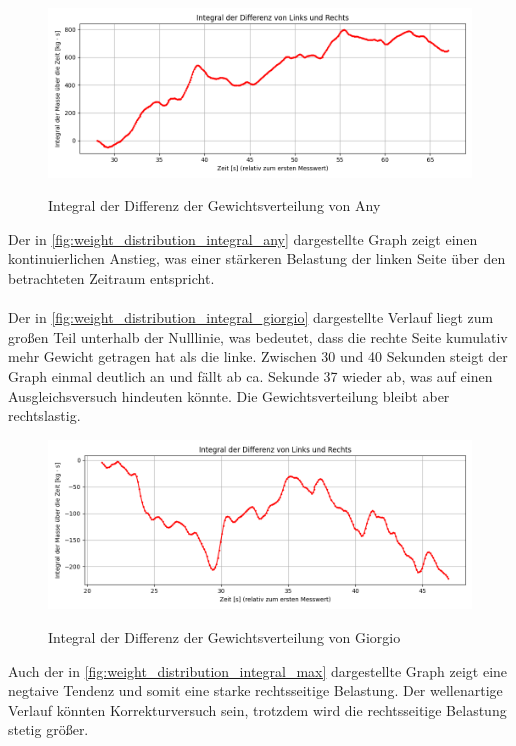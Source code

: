 
\begin{figure}
  \centering
  \includegraphics[width=0.7\linewidth]{img/pyplots/Integral der Differenz - Any.png}\\
  \caption{Integral der Differenz der Gewichtsverteilung von Any}
  \label{fig:weight_distribution_integral_any}
\end{figure}
Der in \autoref{fig:weight_distribution_integral_any} dargestellte Graph zeigt einen kontinuierlichen Anstieg, was einer stärkeren Belastung der linken Seite über den betrachteten Zeitraum entspricht. \\
\\
Der in \autoref{fig:weight_distribution_integral_giorgio} dargestellte Verlauf liegt zum großen Teil unterhalb der Nulllinie, was bedeutet, dass die rechte Seite kumulativ mehr Gewicht getragen hat als die linke.
Zwischen 30 und 40 Sekunden steigt der Graph einmal deutlich an und fällt ab ca. Sekunde 37 wieder ab, was auf einen Ausgleichsversuch hindeuten könnte. Die Gewichtsverteilung bleibt aber rechtslastig.
\begin{figure}
  \centering
  \includegraphics[width=0.7\linewidth]{img/pyplots/Integral der Differenz - Giorgio.png}\\
  \caption{Integral der Differenz der Gewichtsverteilung von Giorgio}
  \label{fig:weight_distribution_integral_giorgio}
\end{figure}
Auch der in \autoref{fig:weight_distribution_integral_max} dargestellte Graph zeigt eine negtaive Tendenz und somit eine starke rechtsseitige Belastung. Der wellenartige Verlauf könnten Korrekturversuch sein, trotzdem wird die rechtsseitige Belastung stetig größer.
